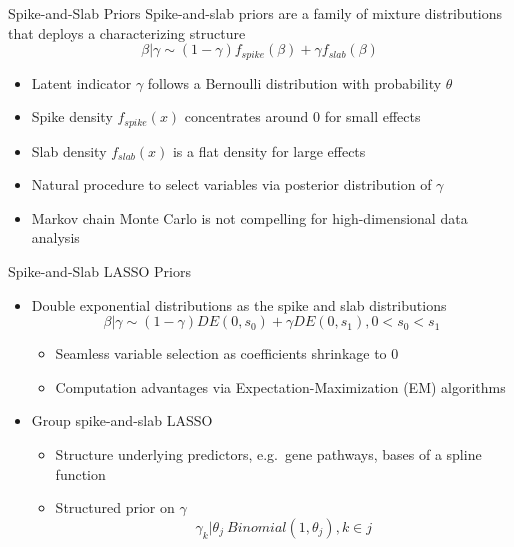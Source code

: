 \documentclass[
  ignorenonframetext,
  aspectratio=169]{beamer}
\providecommand{\tightlist}{%
  \setlength{\itemsep}{0pt}\setlength{\parskip}{0pt}}
\begin{document}
\begin{frame}{Spike-and-Slab Priors}
\protect\hypertarget{spike-and-slab-priors}{}
Spike-and-slab priors are a family of mixture distributions that deploys
a characterizing structure
\[\beta|\gamma \sim (1-\gamma)f_{spike}(\beta) + \gamma f_{slab}(\beta)\]

\begin{itemize}
\item
  Latent indicator \(\gamma\) follows a Bernoulli distribution with
  probability \(\theta\)
\item
  Spike density \(f_{spike}(x)\) concentrates around 0 for small effects
\item
  Slab density \(f_{slab}(x)\) is a flat density for large effects
\item
  Natural procedure to select variables via posterior distribution of
  \(\gamma\)
\item
  Markov chain Monte Carlo is not compelling for high-dimensional data
  analysis
\end{itemize}
\end{frame}

\begin{frame}{Spike-and-Slab LASSO Priors}
\protect\hypertarget{spike-and-slab-lasso-priors}{}
\begin{itemize}
\tightlist
\item
  Double exponential distributions as the spike and slab distributions
  \[\beta|\gamma \sim (1-\gamma)DE(0, s_0) + \gamma DE(0, s_1), 0 < s_0 < s_1\]

  \begin{itemize}
  \tightlist
  \item
    Seamless variable selection as coefficients shrinkage to 0
  \item
    Computation advantages via Expectation-Maximization (EM) algorithms
  \end{itemize}
\item
  Group spike-and-slab LASSO

  \begin{itemize}
  \tightlist
  \item
    Structure underlying predictors, e.g.~gene pathways, bases of a
    spline function
  \item
    Structured prior on \(\gamma\) \[
    \gamma_k | \theta_j ~ Binomial(1, \theta_j), k \in j
    \]
  \end{itemize}
\end{itemize}
\end{frame}
\end{document}
